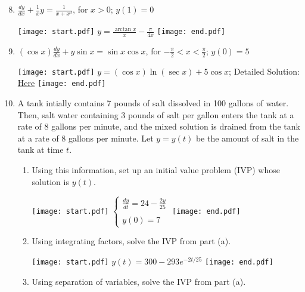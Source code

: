 \documentclass[12pt]{article}
\begin{document}
\medskip


\medskip

\begin{enumerate}
\setcounter{enumi}{7}

\item $\frac{dy}{dx}+\frac{1}{x}y=\frac{1}{x+x^3}$, for $x>0$; $y(1)=0$

\texttt{[image: start.pdf]}
{{$y=\frac{\arctan{x}}{x}-\frac{\pi}{4x}$}}
\texttt{[image: end.pdf]}


\item $(\cos{x})\frac{dy}{dx}+y\sin{x}=\sin{x}\cos{x}$, for $-\frac{\pi}{2}<x<\frac{\pi}{2}$; $y(0)=5$

\texttt{[image: start.pdf]}
{{$y=(\cos{x})\ln{(\sec{x})}+5\cos{x}$; Detailed Solution: \textcolor{blue}{\href{http://www.math.drexel.edu/classes/Calculus/resources/Math123HW/Solutions/123_03_Integrating_Factors_09.pdf}{Here}}}}
\texttt{[image: end.pdf]}


\item A tank intially contains 7 pounds of salt dissolved in 100 gallons of water.  Then, salt water containing 3 pounds of salt per gallon enters the tank at a rate of 8 gallons per minute, and the mixed solution is drained from the tank at a rate of 8 gallons per minute.  Let $y=y(t)$ be the amount of salt in the tank at time $t$.

\begin{enumerate}

\item Using this information, set up an initial value problem (IVP) whose solution is $y(t)$.

\texttt{[image: start.pdf]}
{{$\left\{\begin{array}{l}
\frac{dy}{dt}=24-\frac{2y}{25}\\
\\
y(0)=7
\end{array}\right.$}}
\texttt{[image: end.pdf]}


\item Using integrating factors, solve the IVP from part (a).

\texttt{[image: start.pdf]}
{{$y(t)=300-293e^{-2t/25}$}}
\texttt{[image: end.pdf]}


\item Using separation of variables, solve the IVP from part (a).


\end{enumerate}
\end{enumerate}
\end{document}
